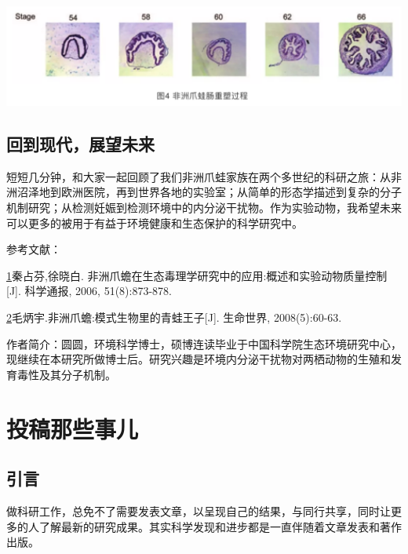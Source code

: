 \documentclass[
]{book}
\begin{document}
\includegraphics[width=6.67in]{images/qingwa4}

\hypertarget{ux56deux5230ux73b0ux4ee3ux5c55ux671bux672aux6765}{%
\subsection{回到现代，展望未来}\label{ux56deux5230ux73b0ux4ee3ux5c55ux671bux672aux6765}}

短短几分钟，和大家一起回顾了我们非洲爪蛙家族在两个多世纪的科研之旅：从非洲沼泽地到欧洲医院，再到世界各地的实验室；从简单的形态学描述到复杂的分子机制研究；从检测妊娠到检测环境中的内分泌干扰物。作为实验动物，我希望未来可以更多的被用于有益于环境健康和生态保护的科学研究中。

参考文献：

\href{陈心想，耿增超。西北农林科技大学学报（自然科学版），2013，41:\%20167-174．}{1}秦占芬,徐晓白. 非洲爪蟾在生态毒理学研究中的应用:概述和实验动物质量控制{[}J{]}. 科学通报, 2006, 51(8):873-878.

\href{Kezhen\%20Qian,\%20Ajay\%20Kumar,\%20et.al.\%20Renew.\%20and\%20Sustain.\%20Energy\%20Reviews,\%202015,\%2042:\%201055-1064.}{2}毛炳宇.非洲爪蟾:模式生物里的青蛙王子{[}J{]}. 生命世界, 2008(5):60-63.

作者简介：圆圆，环境科学博士，硕博连读毕业于中国科学院生态环境研究中心，现继续在本研究所做博士后。研究兴趣是环境内分泌干扰物对两栖动物的生殖和发育毒性及其分子机制。

\hypertarget{ux6295ux7a3fux90a3ux4e9bux4e8bux513f}{%
\section{投稿那些事儿}\label{ux6295ux7a3fux90a3ux4e9bux4e8bux513f}}

\hypertarget{ux5f15ux8a00-2}{%
\subsection{引言}\label{ux5f15ux8a00-2}}

做科研工作，总免不了需要发表文章，以呈现自己的结果，与同行共享，同时让更多的人了解最新的研究成果。其实科学发现和进步都是一直伴随着文章发表和著作出版。
\end{document}
